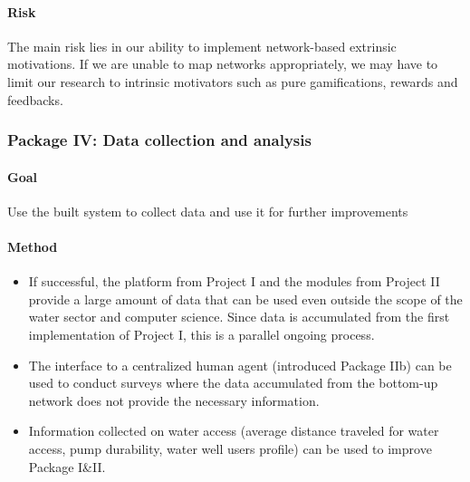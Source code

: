 \documentclass[11pt]{article}
\begin{document}
\paragraph{Risk}
The main risk lies in our ability to implement network-based extrinsic motivations. If we are unable to map networks appropriately, we may have to limit our research to intrinsic motivators such as pure gamifications, rewards and feedbacks. 


\subsubsection*{Package IV: Data collection and analysis}
\paragraph{Goal} Use the built system to collect data and use it for further improvements
\paragraph{Method}

\begin{itemize}
 \item If successful, the platform from Project I and the modules from Project II provide a large amount of data that can be used even outside the scope of the water sector and computer science. Since data is accumulated from the first implementation of Project I, this is a parallel ongoing process.
 \item The interface to a centralized human agent (introduced Package IIb) can be used to conduct surveys where the data accumulated from the bottom-up network does not provide the necessary information.
 
 \item Information collected on water access (average distance traveled for water access, pump durability, water well users profile) can be used to improve Package I\&II.
\end{itemize}
\end{document}
